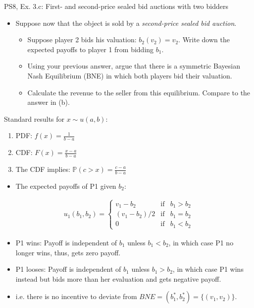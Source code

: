 \begin{frame}{PS8, Ex. 3.c: First- and second-price sealed bid auctions with two bidders}
    \begin{multicols}{2}
      \begin{itemize}
        \item[(c)] Suppose now that the object is sold by a \textit{second-price sealed bid auction}.
        \begin{itemize}\normalsize
          \item[i.]   Suppose player 2 bids his valuation: $b_2(v_2) = v_2$. Write down the expected payoffs to player 1 from bidding $b_1$.
          \item[ii.]  Using your previous answer, argue that there is a symmetric Bayesian Nash Equilibrium (BNE) in which both players bid their valuation.
          \item[iii.] Calculate the revenue to the seller from this equilibrium. Compare to the answer in (b).
        \end{itemize}
      \end{itemize}
      \vspace{-6pt}
      Standard results for $x\sim u(a, b):$
      \vspace{-6pt}
      \begin{enumerate}
        \item[(1)] PDF: $f(x)=\frac{1}{b-a}$
        \item[(2)] CDF: $F(x)=\frac{x-a}{b-a}$
        \item[(3)] The CDF implies: $\mathbb{P}(c>x)=\frac{c-a}{b-a}$
      \end{enumerate}
      \vfill\null\columnbreak
      \begin{itemize}
        \item[(i)] The expected payoffs of P1 given $b_2$:
      \end{itemize}
      \vspace{-12pt}
      \begin{align*}
        u_1(b_1,b_2)=\left\{\begin{array}{lcl}
          v_1-b_2     & \text{if} & b_1>b_2 \\
          (v_1-b_2)/2 & \text{if} & b_1=b_2 \\
          0           & \text{if} & b_1<b_2
        \end{array}\right.
      \end{align*}
      \vspace{-18pt}
      \begin{itemize}
        \item[(ii)] P1 wins: Payoff is independent of $b_1$ unless $b_1<b_2$, in which case P1 no longer wins, thus, gets zero payoff.
        \item[] P1 looses: Payoff is independent of $b_1$ unless $b_1>b_2$, in which case P1 wins instead but bids more than her evaluation and gets negative payoff.
        \item[] i.e. there is no incentive to deviate from $BNE=(b_1^*,b_2^*)=\{(v_1,v_2)\}$.
      \end{itemize}
      \vfill\null
    \end{multicols}
\end{frame}


